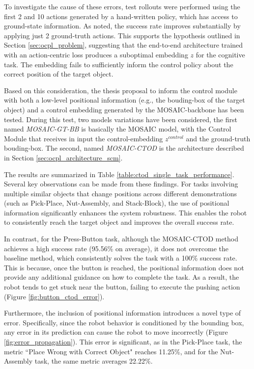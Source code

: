 To investigate the cause of these errors, test rollouts were performed using the first 2 and 10 actions generated by a hand-written policy, which has access to ground-state information. As noted, the success rate improves substantially by applying just 2 ground-truth actions. This supports the hypothesis outlined in Section \ref{sec:ocpl_problem}, suggesting that the end-to-end architecture trained with an action-centric loss produces a suboptimal embedding $z$ for the cognitive task. The embedding fails to sufficiently inform the control policy about the correct position of the target object.

Based on this consideration, the thesis proposal to inform the control module with both a low-level positional information (e.g., the bouding-box of the target object) and a control embedding generated by the MOSAIC-backbone has been tested. During this test, two models variations have been considered, the first named \textit{MOSAIC-GT-BB} is basically the MOSAIC model, with the Control Module that receives in input the control-embedding $z^{control}$ and the ground-truth bouding-box. The second, named \textit{MOSAIC-CTOD} is the architecture described in Section \ref{sec:ocpl_architecture_scm}.


The results are summarized in Table \ref{table:ctod_single_task_performance}. Several key observations can be made from these findings. For tasks involving multiple similar objects that change positions across different demonstrations (such as Pick-Place, Nut-Assembly, and Stack-Block), the use of positional information significantly enhances the system robustness. This enables the robot to consistently reach the target object and improves the overall success rate.

In contrast, for the Press-Button task, although the MOSAIC-CTOD method achieves a high success rate (95.56\% on average), it does not overcome the baseline method, which consistently solves the task with a 100\% success rate. This is because, once the button is reached, the positional information does not provide any additional guidance on how to complete the task. As a result, the robot tends to get stuck near the button, failing to execute the pushing action (Figure \ref{fig:button_ctod_error}).


Furthermore, the inclusion of positional information introduces a novel type of error. Specifically, since the robot behavior is conditioned by the bounding box, any error in its prediction can cause the robot to move incorrectly (Figure \ref{fig:error_propagation}). This error is significant, as in the Pick-Place task, the metric ``Place Wrong with Correct Object" reaches 11.25\%, and for the Nut-Assembly task, the same metric averages 22.22\%.



